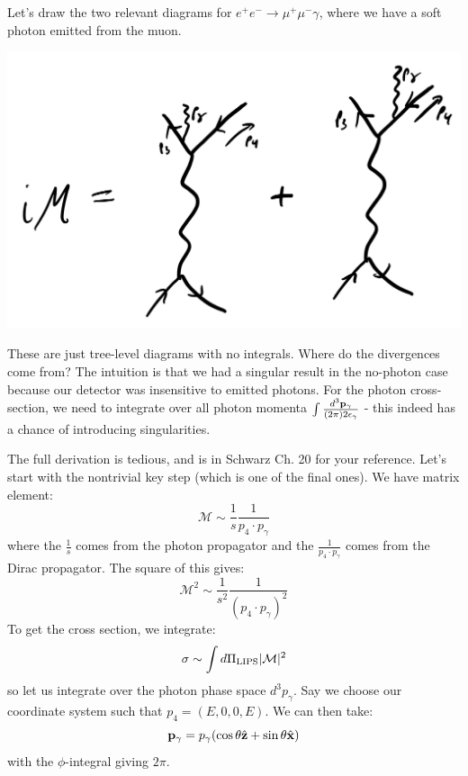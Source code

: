 Let's draw the two relevant diagrams for $e^+e^- \to \mu^+\mu^-\gamma$, where we have a soft photon emitted from the muon.

\begin{center}
    \includegraphics[scale=0.35]{Lectures/Images/lec15-softphotons.png}
\end{center}

These are just tree-level diagrams with no integrals. Where do the divergences come from? The intuition is that we had a singular result in the no-photon case because our detector was insensitive to emitted photons. For the photon cross-section, we need to integrate over all photon momenta $\int \frac{d^3\mathbf{p}_\gamma}{(2\pi)2\epsilon_\gamma}$ - this indeed has a chance of introducing singularities.

The full derivation is tedious, and is in Schwarz Ch. 20 for your reference. Let's start with the nontrivial key step (which is one of the final ones). We have matrix element:
\begin{equation}
    \mathcal{M} \sim \frac{1}{s}\frac{1}{p_4\cdot p_\gamma}
\end{equation}
where the $\frac{1}{s}$ comes from the photon propagator and the $\frac{1}{p_4 \cdot p_\gamma}$ comes from the Dirac propagator. The square of this gives:
\begin{equation}
    \mathcal{M}^2 \sim \frac{1}{s^2}\frac{1}{(p_4 \cdot p_\gamma)^2}
\end{equation}
To get the cross section, we integrate:
\begin{equation}
    \sigma \sim \int d\Pi_{\text{LIPS}}\lvert \mathcal{M} \rvert^2
\end{equation}
so let us integrate over the photon phase space $d^3p_\gamma$. Say we choose our coordinate system such that $p_4 = (E, 0, 0, E)$. We can then take:
\begin{equation}
    \mathbf{p}_\gamma = p_\gamma(\cos\theta\hat{\mathbf{z}} + \sin\theta\hat{\mathbf{x}})
\end{equation}
with the $\phi$-integral giving $2\pi$. 

